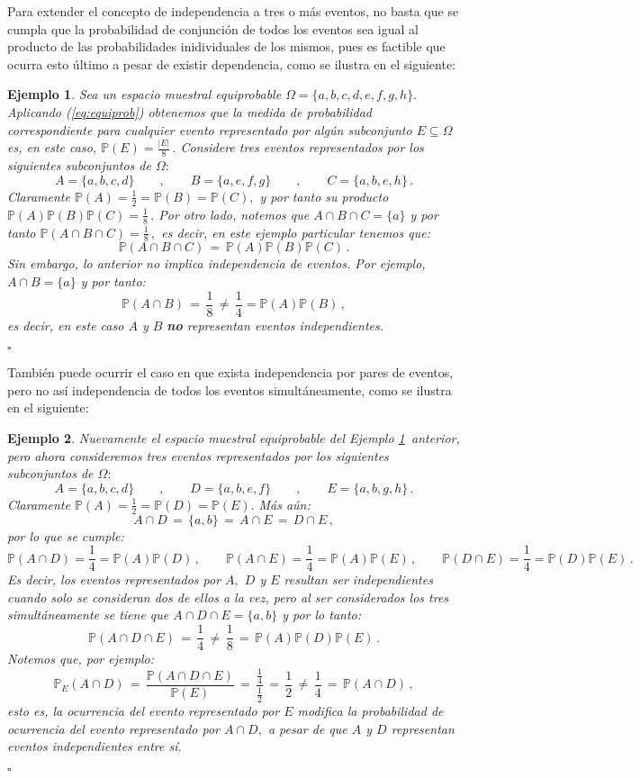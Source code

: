 \documentclass[spanish,10pt,letterpaper]{article}
\newtheorem{ejem}{Ejemplo}
\newcommand{\prob}{\mathbb{P}}
\newcommand{\qed}{\begin{flushright}$\square$\end{flushright}}
\begin{document}
	\medskip 
	
	Para extender el concepto de independencia a tres o más eventos, no basta que se cumpla que la probabilidad de conjunción de todos los eventos sea igual al producto de las probabilidades inidividuales de los mismos, pues es factible que ocurra esto último a pesar de existir dependencia, como se ilustra en el siguiente:
	
	\bigskip 
	
	\begin{ejem}\label{ej:indep3no2}
		Sea un espacio muestral equiprobable $\Omega=\{a,b,c,d,e,f,g,h\}.$ Aplicando (\ref{eq:equiprob}) obtenemos que la medida de probabilidad correspondiente para cualquier evento representado por algún subconjunto $E\subseteq\Omega$ es, en este caso, $\prob(E)=\frac{|E|}{8}\,.$ Considere tres eventos representados por los siguientes subconjuntos de $\Omega:$ $$A=\{a,b,c,d\} \qquad,\qquad B=\{a,e,f,g\} \qquad,\qquad C=\{a,b,e,h\}\,.$$ Claramente $\prob(A)=\frac{1}{2}=\prob(B)=\prob(C),$ y por tanto su producto $\prob(A)\prob(B)\prob(C)=\frac{1}{8}\,.$ Por otro lado, notemos que $A\cap B\cap C=\{a\}$ y por tanto $\prob(A\cap B\cap C)=\frac{1}{8}\,,$ es decir, en este ejemplo particular tenemos que: $$\prob(A\cap B\cap C) \,=\,\prob(A)\prob(B)\prob(C)\,.$$ Sin embargo, lo anterior no implica independencia de eventos. Por ejemplo, $A\cap B=\{a\}$ y por tanto: $$\prob(A\cap B)\,=\,\frac{1}{8}\,\neq\,\frac{1}{4}=\prob(A)\prob(B)\,,$$ es decir, en este caso $A$ y $B$ \textbf{no} representan eventos independientes. \qed
	\end{ejem}
	
	También puede ocurrir el caso en que exista independencia por pares de eventos, pero no así independencia de todos los eventos simultáneamente, como se ilustra en el siguiente:
	
	\bigskip 
	
	\begin{ejem}\label{ej:indep2no3}
		Nuevamente el espacio muestral equiprobable del Ejemplo \ref{ej:indep3no2}\, anterior, pero ahora consideremos tres eventos representados por los siguientes subconjuntos de $\Omega:$ $$A=\{a,b,c,d\} \qquad,\qquad D=\{a,b,e,f\} \qquad,\qquad E=\{a,b,g,h\}\,.$$ Claramente $\prob(A)=\frac{1}{2}=\prob(D)=\prob(E).$ Más aún: $$A\cap D \,=\, \{a,b\} \,=\, A\cap E \,=\, D\cap E\,,$$ por lo que se cumple: $$\prob(A\cap D)=\frac{1}{4}=\prob(A)\prob(D)\,, \qquad \prob(A\cap E)=\frac{1}{4}=\prob(A)\prob(E)\,, \qquad \prob(D\cap E)=\frac{1}{4}=\prob(D)\prob(E)\,.$$ Es decir, los eventos representados por $A,$ $D$ y $E$ resultan ser independientes cuando solo se consideran dos de ellos a la vez, pero al ser considerados los tres simultáneamente se tiene que $A\cap D\cap E=\{a,b\}$ y por lo tanto: $$\prob(A\cap D\cap E) \,=\, \frac{1}{4} \,\neq\, \frac{1}{8} \,=\, \prob(A)\prob(D)\prob(E)\,.$$ Notemos que, por ejemplo: $$\prob_E(A\cap D) \,=\, \frac{\prob(A\cap D\cap E)}{\prob(E)} \,=\, \frac{\frac{1}{4}}{\frac{1}{2}} \,=\, \frac{1}{2} \,\neq\, \frac{1}{4} \,=\,\prob(A\cap D)\,,$$ esto es, la ocurrencia del evento representado por $E$ modifica la probabilidad de ocurrencia del evento representado por $A\cap D,$ a pesar de que $A$ y $D$ representan eventos independientes entre sí. \qed
	\end{ejem}
	
\end{document}
